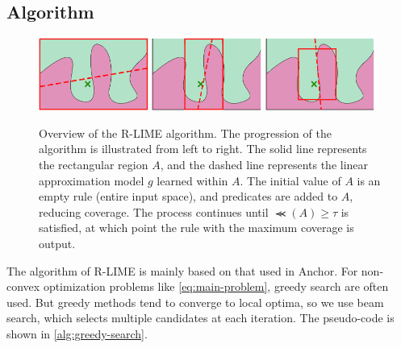 \documentclass[runningheads]{llncs}
\begin{document}
\subsection{Algorithm}
{%
  \begin{figure}[t]
    \centering
    \includegraphics[width=0.32\textwidth]{visual-rlime1}
    \includegraphics[width=0.32\textwidth]{visual-rlime2}
    \includegraphics[width=0.32\textwidth]{visual-rlime3}
    \caption[Overview of the R-LIME algorithm]{%
      Overview of the R-LIME algorithm.
      The progression of the algorithm is illustrated from left to right.
      The solid line represents the rectangular region $A$,
      and the dashed line represents the linear approximation model $g$
      learned within $A$.
      The initial value of $A$ is an empty rule (entire input space),
      and predicates are added to $A$, reducing coverage.
      The process continues until $\Prec(A)\ge\tau$ is satisfied,
      at which point the rule with the maximum coverage is output.
    }
  \end{figure}
  \def\myidt{\hspace{\algorithmicindent}}
  \begin{algorithm}[p]
    \small
    
  \end{algorithm}

  \begin{algorithm}[p]
    \small
    
  \end{algorithm}

  \begin{algorithm}[p]
    \small
    
  \end{algorithm}

  \begin{algorithm}[p]
    \small
    
  \end{algorithm}
}
The algorithm of R-LIME
is mainly based on that used in Anchor\cite{ribeiro2018anchors}.
For non-convex optimization problems like \cref{eq:main-problem},
greedy search are often used.
But greedy methods tend to converge to local optima,
so we use beam search, which selects multiple candidates at each iteration.
The pseudo-code is shown in \cref{alg:greedy-search}.
\end{document}
